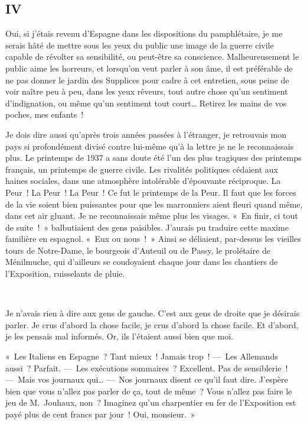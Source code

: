 \documentclass[french,twoside]{book} %
\begin{document}
\subsection[{IV}]{IV}
\noindent Oui, si j’étais revenu d’Espagne dans les dispositions du pamphlétaire, je me serais hâté de mettre sous les yeux du public une image de la guerre civile capable de révolter sa sensibilité, ou peut-être sa conscience. Malheureusement le public aime les horreurs, et lorsqu’on veut parler à son âme, il est préférable de ne pas donner le jardin des Supplices pour cadre à cet entretien, sous peine de voir naître peu à peu, dans les yeux rêveurs, tout autre chose qu’un sentiment d’indignation, ou même qu’un sentiment tout court… Retirez les mains de vos poches, mes enfants !\par
Je dois dire aussi qu’après trois années passées à l’étranger, je retrouvais mon pays si profondément divisé contre lui-même qu’à la lettre je ne le reconnaissais plus. Le printemps de 1937 a sans doute été l’un des plus tragiques des printemps français, un printemps de guerre civile. Les rivalités politiques cédaient aux haines sociales, dans une atmosphère intolérable d’épouvante réciproque. La Peur ! La Peur ! La Peur ! Ce fut le printemps de la Peur. Il faut que les forces de la vie soient bien puissantes pour que les marronniers aient fleuri quand même, dans cet air gluant. Je ne reconnaissais même plus les visages. « En finir, ci tout de suite ! » balbutiaient des gens paisibles. J’aurais pu traduire cette maxime familière en espagnol. « Eux ou nous ! » Ainsi se déliaient, par-dessus les vieilles tours de Notre-Dame, le bourgeois d’Auteuil ou de Passy, le prolétaire de Ménilmuche, qui d’ailleurs se coudoyaient chaque jour dans les chantiers de l’Exposition, ruisselants de pluie.\par
 \par
Je n’avais rien à dire aux gens de gauche. C’est aux gens de droite que je désirais parler. Je crus d’abord la chose facile, je crus d’abord la chose facile. Et d’abord, je les pensais mal informés. Or, ils l’étaient aussi bien que moi.\par
« Les Italiens en Espagne ? Tant mieux ! Jamais trop ! — Les Allemands aussi ? Parfait. — Les exécutions sommaires ? Excellent. Pas de sensiblerie ! — Mais vos journaux qui… — Nos journaux disent ce qu’il faut dire. J’espère bien que vous n’allez pas parler de ça, tout de même ? Vous n’allez pas faire le jeu de M. Jouhaux, non ? Imaginez qu’un charpentier en fer de l’Exposition est payé plus de cent francs par jour ! Oui, monsieur. »\par
\end{document}
